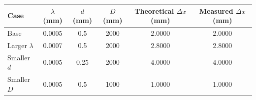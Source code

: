 \begin{tabular}{|l|c|c|c|c|c|}
\hline
Case & $\lambda$ (mm) & $d$ (mm) & $D$ (mm) & Theoretical $\Delta x$ (mm) & Measured $\Delta x$ (mm) \\ \hline
Base & 0.0005 & 0.5 & 2000 & 2.0000 & 2.0000 \\
Larger $\lambda$ & 0.0007 & 0.5 & 2000 & 2.8000 & 2.8000 \\
Smaller $d$ & 0.0005 & 0.25 & 2000 & 4.0000 & 4.0000 \\
Smaller $D$ & 0.0005 & 0.5 & 1000 & 1.0000 & 1.0000 \\
\hline
\end{tabular}
